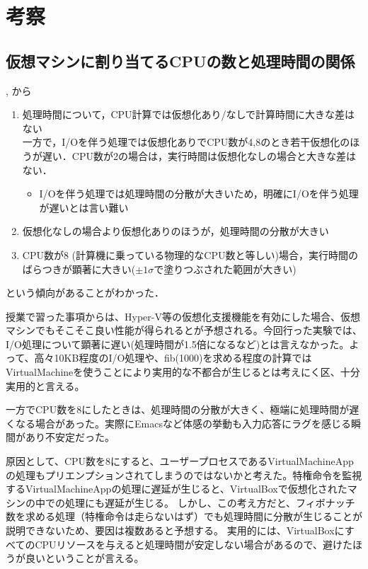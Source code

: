 \documentclass[onecolumn]{preport}
\begin{document}
\section{考察}
\subsection{仮想マシンに割り当てるCPUの数と処理時間の関係}
, から
\begin{enumerate}
\item 処理時間について，CPU計算では仮想化あり/なしで計算時間に大きな差はない\\一方で，I/Oを伴う処理では仮想化ありでCPU数が4,8のとき若干仮想化のほうが遅い．CPU数が2の場合は，実行時間は仮想化なしの場合と大きな差はない．
  \begin{itemize}
  \item I/Oを伴う処理では処理時間の分散が大きいため，明確にI/Oを伴う処理が遅いとは言い難い
  \end {itemize}
\item 仮想化なしの場合より仮想化ありのほうが，処理時間の分散が大きい
\item CPU数が8 (計算機に乗っている物理的なCPU数と等しい)場合，実行時間のばらつきが顕著に大きい($\pm 1 \sigma$で塗りつぶされた範囲が大きい)
\end{enumerate}
という傾向があることがわかった．

授業で習った事項からは、Hyper-V等の仮想化支援機能を有効にした場合、仮想マシンでもそこそこ良い性能が得られるとが予想される。今回行った実験では、I/O処理について顕著に遅い(処理時間が1.5倍になるなど)とは言えなかった。よって、高々10KB程度のI/O処理や、fib(1000)を求める程度の計算ではVirtualMachineを使うことにより実用的な不都合が生じるとは考えにく区、十分実用的と言える。

一方でCPU数を8にしたときは、処理時間の分散が大きく、極端に処理時間が遅くなる場合があった。実際にEmacsなど体感の挙動も入力応答にラグを感じる瞬間があり不安定だった。

原因として、CPU数を8にすると、ユーザープロセスであるVirtualMachineAppの処理もプリエンプションされてしまうのではないかと考えた。特権命令を監視するVirtualMachineAppの処理に遅延が生じると、VirtualBoxで仮想化されたマシンの中での処理にも遅延が生じる。
しかし、この考え方だと、フィボナッチ数を求める処理（特権命令は走らないはず）でも処理時間に分散が生じることが説明できないため、要因は複数あると予想する。
実用的には、VirtualBoxにすべてのCPUリソースを与えると処理時間が安定しない場合があるので、避けたほうが良いということが言える。
\end{document}
